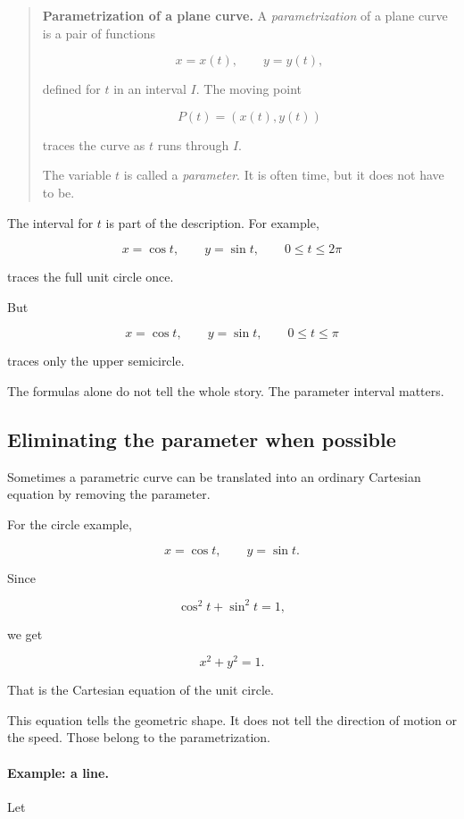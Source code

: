 \begin{quote}
\textbf{Parametrization of a plane curve.}
A \emph{parametrization} of a plane curve is a pair of functions

\[
x=x(t),
\qquad
y=y(t),
\]

defined for \(t\) in an interval \(I\).  The moving point

\[
P(t)=(x(t),y(t))
\]

traces the curve as \(t\) runs through \(I\).

The variable \(t\) is called a \emph{parameter}.  It is often time, but it does not have
to be.
\end{quote}

The interval for \(t\) is part of the description.  For example,

\[
x=\cos t,
\qquad
y=\sin t,
\qquad
0\le t\le 2\pi
\]

traces the full unit circle once.

But

\[
x=\cos t,
\qquad
y=\sin t,
\qquad
0\le t\le \pi
\]

traces only the upper semicircle.

The formulas alone do not tell the whole story.  The parameter interval matters.

\subsection{Eliminating the parameter when possible}
\label{subsec:eliminating-parameter}

Sometimes a parametric curve can be translated into an ordinary Cartesian equation by
removing the parameter.

For the circle example,

\[
x=\cos t,
\qquad
y=\sin t.
\]

Since

\[
\cos^2 t+\sin^2 t=1,
\]

we get

\[
x^2+y^2=1.
\]

That is the Cartesian equation of the unit circle.

This equation tells the geometric shape.  It does not tell the direction of motion or the
speed.  Those belong to the parametrization.

\paragraph{Example: a line.}
Let

